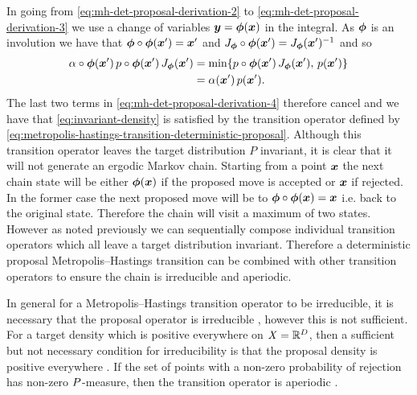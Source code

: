 In going from \eqref{eq:mh-det-proposal-derivation-2} to \eqref{eq:mh-det-proposal-derivation-3} we use a change of variables $\boldsymbol{y} = \boldsymbol{\phi}(\boldsymbol{x})$ in the integral. As $\boldsymbol{\phi}$ is an involution we have that $\boldsymbol{\phi}\circ\boldsymbol{\phi}(\boldsymbol{x}') = \boldsymbol{x}'$ and $J_{\boldsymbol{\phi}}\circ\boldsymbol{\phi}(\boldsymbol{x}') = J_{\boldsymbol{\phi}}(\boldsymbol{x}')^{-1}$ and so
\begin{equation}\label{eq:mh-det-proposal-derivation-5}
\begin{split}
  \alpha\circ\vct{\phi}(\vct{x}') \, \tgtdens\circ\vct{\phi}(\vct{x}') \, 
  J_{\vct{\phi}}(\vct{x}') &=
  \min\lbr 
    \tgtdens\circ\vct{\phi}(\vct{x}') \, J_{\vct{\phi}}(\vct{x}'),\,
    p(\vct{x}')
  \rbr 
  \\
  &=
  \alpha(\vct{x}')\,\tgtdens(\vct{x}').
\end{split}
\end{equation}
The last two terms in \eqref{eq:mh-det-proposal-derivation-4} therefore cancel and we have that \eqref{eq:invariant-density} is satisfied by the transition operator defined by \eqref{eq:metropolis-hastings-transition-deterministic-proposal}. Although this transition operator leaves the target distribution $P$ invariant, it is clear that it will not generate an ergodic Markov chain. Starting from a point $\boldsymbol{x}$ the next chain state will be either $\boldsymbol{\phi}(\boldsymbol{x})$ if the proposed move is accepted or $\boldsymbol{x}$ if rejected. In the former case the next proposed move will be to $\boldsymbol{\phi} \circ \boldsymbol{\phi}(\boldsymbol{x}) = \boldsymbol{x}$ i.e. back to the original state. Therefore the chain will visit a maximum of two states. However as noted previously we can sequentially compose individual transition operators which all leave a target distribution invariant. Therefore a deterministic proposal Metropolis--Hastings transition can be combined with other transition operators to ensure the chain is irreducible and aperiodic.

In general for a Metropolis--Hastings transition operator to be irreducible, it is necessary that the proposal operator is irreducible \citep{tierney1994markov}, however this is not sufficient. For a target density which is positive everywhere on $\mathit{X} = \mathbb{R}^D$, then a sufficient but not necessary condition for irreducibility is that the proposal density is positive everywhere \citep{roberts2004general}. If the set of points with a non-zero probability of rejection has non-zero $P$-measure, then the transition operator is aperiodic \citep{tierney1994markov}.

